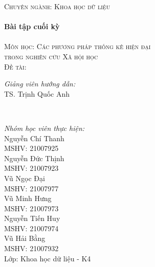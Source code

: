 \documentclass[14pt, a4paper]{article}
\numberwithin{equation}{section}
\numberwithin{figure}{section}
\theoremstyle{sltheorem}
\theoremstyle{soltheorem}
\begin{document}
\begin{titlepage}
    \textsc{\Large Chuyên ngành: Khoa học dữ liệu}\\[0.5cm] %



    \HRule \\[0.4cm]
    { \huge \bfseries Bài tập cuối kỳ}\\[0.4cm] %
    \HRule \\[1.5cm]

    \textsc{\Large Môn học: Các phương pháp thống kê hiện đại \\ trong nghiên cứu Xã hội học}\\[1cm] %


    \textsc{\Large Đề tài: }\\[1cm]


    \begin{minipage}{0.4\textwidth}
        \begin{flushleft} \large
            \emph{Giảng viên hướng dẫn:} \\
            TS. Trịnh Quốc Anh %
        \end{flushleft}
    \end{minipage}\\[0.5cm]

    \begin{minipage}{0.4\textwidth}
        \begin{flushleft} \small
            \emph{Nhóm học viên thực hiện:}\\
            Nguyễn Chí Thanh \\
            MSHV: 21007925 \\ %
            Nguyễn Đức Thịnh \\
            MSHV: 21007923 \\
            Vũ Ngọc Đại \\
            MSHV: 21007977 \\
            Vũ Minh Hưng \\
            MSHV: 21007973 \\
            Nguyễn Tiến Huy \\
            MSHV: 21007974\\
            Vũ Hải Bằng \\
            MSHV: 21007932\\
            Lớp: Khoa học dữ liệu - K4
        \end{flushleft}
    \end{minipage}



\end{titlepage}
\end{document}
